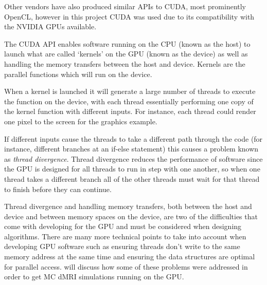 Other vendors have also produced similar \acp{API} to \ac{CUDA}, most prominently OpenCL\cite{Stone2010}, however in this project \ac{CUDA} was used due to its compatibility with the NVIDIA \acp{GPU} available.

The \ac{CUDA} \ac{API} enables software running on the \ac{CPU} (known as the host) to launch what are called `kernels' on the \ac{GPU} (known as the device) as well as handling the memory transfers between the host and device. Kernels are the parallel functions which will run on the device.

When a kernel is launched it will generate a large number of threads to execute the function on the device, with each thread essentially performing one copy of the kernel function with different inputs.
For instance, each thread could render one pixel to the screen for the graphics example.

If different inputs cause the threads to take a different path through the code (for instance, different branches at an if-else statement) this causes a problem known as \emph{thread divergence}.
Thread divergence reduces the performance of software since the \ac{GPU} is designed for all threads to run in step with one another, so when one thread takes a different branch all of the other threads must wait for that thread to finish before they can continue. 

Thread divergence and handling memory transfers, both between the host and device and between memory spaces on the device, are two of the difficulties that come with developing for the \ac{GPU} and must be considered when designing algorithms.  
There are many more technical points to take into account when developing \ac{GPU} software such as ensuring threads don't write to the same memory address at the same time and ensuring the data structures are optimal for parallel access.
 will discuss how some of these problems were addressed in order to get \ac{MC} \ac{dMRI} simulations running on the \ac{GPU}. 



